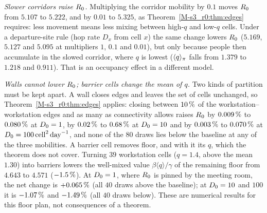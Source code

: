 \emph{Slower corridors raise $R_0$.} Multiplying the corridor mobility by $0.1$ moves $R_0$ from $5.107$ to
$5.222$, and by $0.01$ to $5.325$, as Theorem~\ref{M-s3_r0:thm:edges} requires: less movement means less mixing
between high-$q$ and low-$q$ cells. Under a departure-site rule (hop rate $D_x$ from cell $x$) the same change
lowers $R_0$ ($5.169$, $5.127$ and $5.095$ at multipliers $1$, $0.1$ and $0.01$), but only because people then
accumulate in the slowed corridor, where $q$ is lowest ($\langle q\rangle_{\pi}$ falls from $1.379$ to $1.218$ and $0.911$).
That is an occupancy effect in a different model.

\emph{Walls cannot lower $R_0$; barrier cells change the mean of $q$.} Two kinds of partition
must be kept apart. A wall closes edges and leaves the set of cells unchanged, so
Theorem~\ref{M-s3_r0:thm:edges} applies: closing between $10\,\%$ of the workstation--workstation edges and
as many as connectivity allows raises $R_0$ by $0.009\,\%$ to $0.080\,\%$ at $D_0=1$, by $0.02\,\%$ to
$0.68\,\%$ at $D_0=10$ and by $0.003\,\%$ to $0.070\,\%$ at $D_0=100\,\mathrm{cell}^2\,\mathrm{day}^{-1}$, and none of the $80$ draws
lies below the baseline at any of the three mobilities. A barrier cell removes floor, and with it its $q$,
which the theorem does not cover. Turning $39$ workstation cells ($q=1.4$, above the mean $1.30$) into
barriers lowers the well-mixed value $\beta\langle q\rangle/\gamma$ of the remaining floor from $4.643$ to
$4.571$ ($-1.5\,\%$). At $D_0=1$, where $R_0$ is pinned by the meeting room, the net change is $+0.065\,\%$
(all $40$ draws above the baseline); at $D_0=10$ and $100$ it is $-1.07\,\%$ and $-1.49\,\%$ (all $40$
draws below). These are numerical results for this floor plan, not consequences of a theorem.

